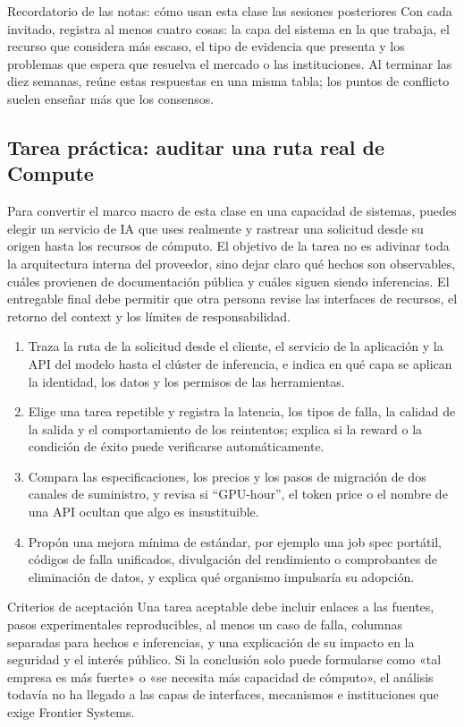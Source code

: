\documentclass[a4paper]{article}
\begin{document}
\begin{knowledgebox}{Recordatorio de las notas: cómo usan esta clase las sesiones posteriores}
Con cada invitado, registra al menos cuatro cosas: la capa del sistema en la que trabaja, el recurso que considera más escaso, el tipo de evidencia que presenta y los problemas que espera que resuelva el mercado o las instituciones. Al terminar las diez semanas, reúne estas respuestas en una misma tabla; los puntos de conflicto suelen enseñar más que los consensos.
\end{knowledgebox}

\subsection{Tarea práctica: auditar una ruta real de Compute}

Para convertir el marco macro de esta clase en una capacidad de sistemas, puedes elegir un servicio de IA que uses realmente y rastrear una solicitud desde su origen hasta los recursos de cómputo. El objetivo de la tarea no es adivinar toda la arquitectura interna del proveedor, sino dejar claro qué hechos son observables, cuáles provienen de documentación pública y cuáles siguen siendo inferencias. El entregable final debe permitir que otra persona revise las interfaces de recursos, el retorno del context y los límites de responsabilidad.

\begin{enumerate}
  \item Traza la ruta de la solicitud desde el cliente, el servicio de la aplicación y la API del modelo hasta el clúster de inferencia, e indica en qué capa se aplican la identidad, los datos y los permisos de las herramientas.
  \item Elige una tarea repetible y registra la latencia, los tipos de falla, la calidad de la salida y el comportamiento de los reintentos; explica si la reward o la condición de éxito puede verificarse automáticamente.
  \item Compara las especificaciones, los precios y los pasos de migración de dos canales de suministro, y revisa si ``GPU-hour'', el token price o el nombre de una API ocultan que algo es insustituible.
  \item Propón una mejora mínima de estándar, por ejemplo una job spec portátil, códigos de falla unificados, divulgación del rendimiento o comprobantes de eliminación de datos, y explica qué organismo impulsaría su adopción.
\end{enumerate}

\begin{importantbox}{Criterios de aceptación}
Una tarea aceptable debe incluir enlaces a las fuentes, pasos experimentales reproducibles, al menos un caso de falla, columnas separadas para hechos e inferencias, y una explicación de su impacto en la seguridad y el interés público. Si la conclusión solo puede formularse como «tal empresa es más fuerte» o «se necesita más capacidad de cómputo», el análisis todavía no ha llegado a las capas de interfaces, mecanismos e instituciones que exige Frontier Systems.
\end{importantbox}
\end{document}
